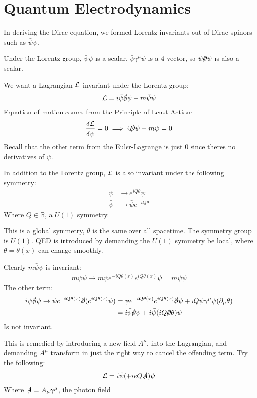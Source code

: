 \section{Quantum Electrodynamics}
In deriving the Dirac equation, we formed Lorentz invariants out of Dirac spinors such as $\bar{\psi}\psi$.

Under the Lorentz group, $\bar{\psi}\psi$ is a scalar, $\bar{\psi}\gamma^\mu\psi$ is a 4-vector, so $\bar{\psi}\sla{\D}\psi$ is also a scalar.

We want a Lagrangian $\mathcal{L}$ invariant under the Lorentz group:
\begin{align*}
  \L=i\bar{\psi}\sla{\D}\psi-m\bar{\psi}\psi
\end{align*}
Equation of motion comes from the Principle of Least Action:
\begin{align*}
  \fdv{\L}{\bar{\psi}}=0\implies i\sla{D}\psi-m\psi=0
\end{align*}
Recall that the other term from the Euler-Lagrange is just $0$ since theres no derivatives of $\bar{\psi}$.

In addition to the Lorentz group, $\mathcal{L}$ is also invariant under the following symmetry:
\begin{align*}
  \psi&\to e^{iQ\theta}\psi\\
  \bar{\psi}&\to \bar{\psi}e^{-iQ\theta}
\end{align*}
Where $Q\in\mathbb{R}$, a $U(1)$ symmetry.

This is a \underline{global} symmetry, $\theta$ is the same over all spacetime. The symmetry group is $U(1)$. QED is introduced by demanding the $U(1)$ symmetry be \underline{local}, where $\theta=\theta(x)$ can change smoothly.

Clearly $m\bar{\psi}\psi$ is invariant:
\begin{align*}
  m\bar{\psi}\psi\to m\bar{\psi}e^{-iQ\theta(x)}e^{iQ\theta(x)}\psi
  =m\bar{\psi}\psi
\end{align*}
The other term:
\begin{align*}
  i\bar{\psi}\sla{\D}\psi\to
  \bar{\psi}e^{-iQ\theta(x)}\sla{\D}(e^{iQ\theta(x)}\psi)
  &=\bar{\psi}e^{-iQ\theta(x)}e^{iQ\theta(x)}\sla{\D}\psi
  +iQ\bar{\psi}\gamma^\mu\psi(\D_\mu\theta)\\
  &=i\bar{\psi}\sla{\D}\psi+i\bar{\psi}(iQ\sla{\D}\theta)\psi
\end{align*}
Is not invariant.

This is remedied by introducing a new field $A^\mu$, into the Lagrangian, and demanding $A^\mu$ transform in just the right way to cancel the offending term. Try the following:
\begin{align*}
  \mathcal{L}=i\bar{\psi}(+ieQ\slashed{A})\psi
\end{align*}
Where $\slashed{A}=A_\mu\gamma^\mu$, the photon field

